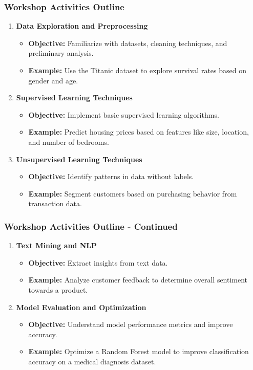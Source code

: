 \documentclass[aspectratio=169]{beamer}
\begin{document}
\begin{frame}[fragile]
    \frametitle{Workshop Activities Outline}
    \begin{enumerate}
        \item \textbf{Data Exploration and Preprocessing}
            \begin{itemize}
                \item \textbf{Objective:} Familiarize with datasets, cleaning techniques, and preliminary analysis.
                \item \textbf{Example:} Use the Titanic dataset to explore survival rates based on gender and age.
            \end{itemize}
        \item \textbf{Supervised Learning Techniques}
            \begin{itemize}
                \item \textbf{Objective:} Implement basic supervised learning algorithms.
                \item \textbf{Example:} Predict housing prices based on features like size, location, and number of bedrooms.
            \end{itemize}
        \item \textbf{Unsupervised Learning Techniques}
            \begin{itemize}
                \item \textbf{Objective:} Identify patterns in data without labels.
                \item \textbf{Example:} Segment customers based on purchasing behavior from transaction data.
            \end{itemize}
    \end{enumerate}
\end{frame}

\begin{frame}[fragile]
    \frametitle{Workshop Activities Outline - Continued}
    \begin{enumerate}[resume]
        \item \textbf{Text Mining and NLP}
            \begin{itemize}
                \item \textbf{Objective:} Extract insights from text data.
                \item \textbf{Example:} Analyze customer feedback to determine overall sentiment towards a product.
            \end{itemize}
        \item \textbf{Model Evaluation and Optimization}
            \begin{itemize}
                \item \textbf{Objective:} Understand model performance metrics and improve accuracy.
                \item \textbf{Example:} Optimize a Random Forest model to improve classification accuracy on a medical diagnosis dataset.
            \end{itemize}
    \end{enumerate}
\end{frame}
\end{document}
